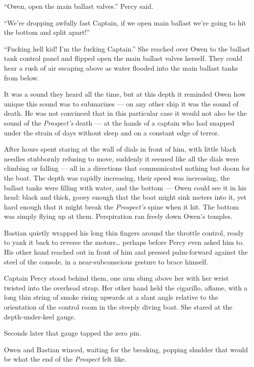 \documentclass[]{scrbook}
\begin{document}
``Owen, open the main ballast valves.'' Percy said.

``We're dropping awfully fast Captain, if we open main ballast we're
going to hit the bottom and split apart!''

``Fucking hell kid! I'm the fucking Captain.'' She reached over Owen to
the ballast tank control panel and flipped open the main ballast valves
herself. They could hear a rush of air escaping above as water flooded
into the main ballast tanks from below.

It was a sound they heard all the time, but at this depth it reminded
Owen how unique this sound was to submarines --- on any other ship it
was the sound of death. He was not convinced that in this particular
case it would not also be the sound of the \emph{Prospect's} death ---
at the hands of a captain who had snapped under the strain of days
without sleep and on a constant edge of terror.

After hours spent staring at the wall of dials in front of him, with
little black needles stubbornly refusing to move, suddenly it seemed
like all the dials were climbing or falling --- all in a directions that
communicated nothing but doom for the boat. The depth was rapidly
increasing, their speed was increasing, the ballast tanks were filling
with water, and the bottom --- Owen could see it in his head: black and
thick, gooey enough that the boat might sink meters into it, yet hard
enough that it might break the \emph{Prospect's} spine when it hit. The
bottom was simply flying up at them. Perspiration ran freely down Owen's
temples.

Bastian quietly wrapped his long thin fingers around the throttle
control, ready to yank it back to reverse the motors\ldots{} perhaps
before Percy even asked him to. His other hand reached out in front of
him and pressed palm-forward against the steel of the console, in a
near-subconscious gesture to brace himself.

Captain Percy stood behind them, one arm slung above her with her wrist
twisted into the overhead strap. Her other hand held the cigarillo,
aflame, with a long thin string of smoke rising upwards at a slant angle
relative to the orientation of the control room in the steeply diving
boat. She stared at the depth-under-keel gauge.

Seconds later that gauge tapped the zero pin.

Owen and Bastian winced, waiting for the breaking, popping shudder that
would be what the end of the \emph{Prospect} felt like.
\end{document}
